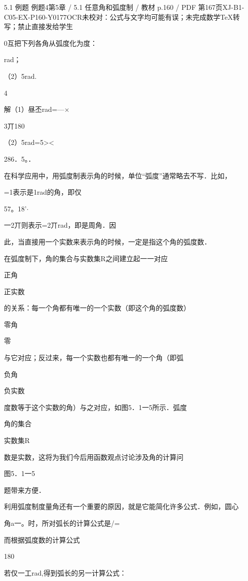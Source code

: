 \begin{bankitem}{5.1 例题 例题4}{第5章 / 5.1 任意角和弧度制 / 教材 p.160 / PDF 第167页}{XJ-B1-C05-EX-P160-Y0177}{OCR未校对：公式与文字均可能有误；未完成数学TeX转写；禁止直接发给学生}
\begin{ocrdraft}
\par
0互把下列各角从弧度化为度：
\par
rad；
\par
（2）5rad.
\par
4
\par
解（1）昼丕rad=—\ensuremath{\times}
\par
3丌180
\par
（2）5rad=5><
\par
286．5。．
\par
在科学应用中，用弧度制表示角的时候，单位“弧度”通常略去不写．比如，
\par
=1表示是1rad的角，即仅
\par
57。18'\ensuremath{\cdot}
\par
一2丌则表示=2丌rad，即是周角．因
\par
此，当直接用一个实数来表示角的时候，一定是指这个角的弧度数．
\par
在弧度制下，角的集合与实数集R之间建立起一一对应
\par
正角
\par
正实数
\par
的关系：每一个角都有唯一的一个实数（即这个角的弧度数）
\par
零角
\par
零
\par
与它对应；反过来，每一个实数也都有唯一的一个角（即弧
\par
负角
\par
负实数
\par
度数等于这个实数的角）与之对应，如图5．1一5所示．弧度
\par
角的集合
\par
实数集R
\par
数是实数，这将为我们今后用函数观点讨论涉及角的计算问
\par
图5．1一5
\par
题带来方便．
\par
利用弧度制度量角还有一个重要的原因，就是它能简化许多公式．例如，圆心
\par
角a一。时，所对弧长的计算公式是/=
\par
而根据弧度数的计算公式
\par
180
\par
若仅一工rad,得到弧长的另一计算公式：
\end{ocrdraft}
\end{bankitem}
